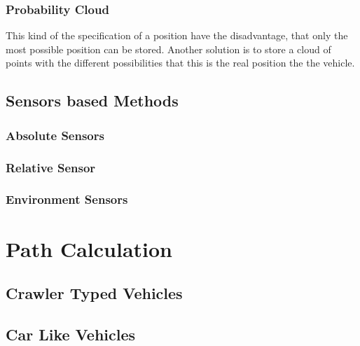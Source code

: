 \subsubsection{Probability Cloud}
This kind of the specification of a position have the disadvantage, that only the most possible position can be stored.
Another solution is to store a cloud of points with the different possibilities that this is the real position the the vehicle.



\subsection{Sensors based Methods}


\subsubsection{Absolute Sensors}


\subsubsection{Relative Sensor}


\subsubsection{Environment Sensors}


\section{Path Calculation}


\subsection{Crawler Typed Vehicles}


\subsection{Car Like Vehicles}


